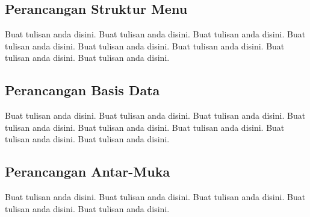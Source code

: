 \subsection{Perancangan Struktur Menu}
Buat tulisan anda disini. Buat tulisan anda disini. Buat tulisan anda disini. Buat tulisan anda disini. Buat tulisan anda disini. Buat tulisan anda disini. Buat tulisan anda disini. Buat tulisan anda disini.

\subsection{Perancangan Basis Data}
Buat tulisan anda disini. Buat tulisan anda disini. Buat tulisan anda disini. Buat tulisan anda disini. Buat tulisan anda disini. Buat tulisan anda disini. Buat tulisan anda disini. Buat tulisan anda disini.

\subsection{Perancangan Antar-Muka}
Buat tulisan anda disini. Buat tulisan anda disini. Buat tulisan anda disini. Buat tulisan anda disini. Buat tulisan anda disini.